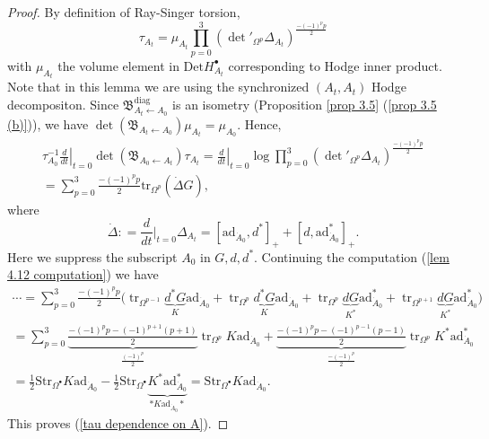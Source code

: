 \documentclass[11pt,a4paper]{amsart}
\theoremstyle{plain} %
\theoremstyle{definition}
\theoremstyle{remark}
\newcommand{\tr}{\operatorname{tr}}
\newcommand{\mr}{\mathrm}
\newcommand{\bt}{\bullet}
\newcommand{\ad}{\mathrm{ad}}
\newcommand{\la}{\leftarrow}
\newcommand{\BB}{\mathfrak{B}}
\begin{document}
\begin{proof}
    By definition of Ray-Singer torsion, 
    \begin{equation}
    \tau_{A_t}=\mu_{A_t} \prod_{p=0}^3 \left({\det}'_{\Omega^p} \Delta_{A_t}\right)^{\frac{-(-1)^pp}{2}}
    \end{equation}
with $\mu_{A_t}$ the volume element in $\mr{Det}H^\bt_{A_t}$ corresponding to Hodge inner product. Note that in this lemma we are using the synchronized $(A_t,A_t)$ Hodge decompositon. Since $\BB_{A_t\la A_0}^\mr{diag}$ is an isometry (Proposition \ref{prop 3.5} (\ref{prop 3.5 (b)})), we have $\det(\BB_{A_t\la A_0}) \mu_{A_t}=\mu_{A_0}$. Hence,
\begin{multline}\label{lem 4.12 computation}
     \tau_{A_0}^{-1}\left.\frac{d}{dt}\right|_{t=0}\det(\BB_{A_0\la A_t})\tau_{A_t}=
     \left.\frac{d}{dt}\right|_{t=0} \log \prod_{p=0}^3 \left({\det}'_{\Omega^p} \Delta_{A_t}\right)^{\frac{-(-1)^pp}{2}} \\
     =
     \sum_{p=0}^3\frac{-(-1)^p p}{2}   %
     \mr{tr}_{\Omega^p} (\dot{\Delta} G), 
\end{multline}
where 
$$\dot{\Delta}\colon=\frac{d}{dt}\Big|_{t=0}\Delta_{A_t}=[\ad_{\dot{A}_0},d^*]_+ +
[d,\ad^*_{\dot{A}_0}]_+ .$$
Here we suppress the subscript $A_0$ in $G,d,d^*$.  Continuing the computation (\ref{lem 4.12 computation}) we have
\begin{multline*}
    \cdots = \sum_{p=0}^3 \frac{-(-1)^p p}{2}\Big(\tr_{\Omega^{p-1}} \underbrace{d^*G}_K \ad_{\dot{A}_0} +\tr_{\Omega^{p}} \underbrace{d^*G}_K \ad_{\dot{A}_0} 
    +\tr_{\Omega^p} \underbrace{dG}_{K^*} \ad^*_{\dot{A}_0} + \tr_{\Omega^{p+1}} \underbrace{dG}_{K^*} \ad^*_{\dot{A}_0}
    \Big)
\\ =
\sum_{p=0}^3 \underbrace{\frac{-(-1)^p p-(-1)^{p+1}(p+1)}{2}}_{\frac{(-1)^p}{2}} \tr_{\Omega^p} K \ad_{\dot{A}_0} +
\underbrace{\frac{-(-1)^p p-(-1)^{p-1}(p-1)}{2}}_{\frac{-(-1)^p}{2}} \tr_{\Omega^p} K^* \ad^*_{\dot{A}_0}\\
=\frac12 \mr{Str}_{\Omega^\bt} K\ad_{\dot{A}_0}- \frac12 \mr{Str}_{\Omega^\bt} \underbrace{K^*\ad^*_{\dot{A}_0}}_{*K\ad_{\dot{A}_0}*} = \mr{Str}_{\Omega^\bt} K\ad_{\dot{A}_0}.
\end{multline*}
This proves (\ref{tau dependence on A}).
\end{proof}
\end{document}

